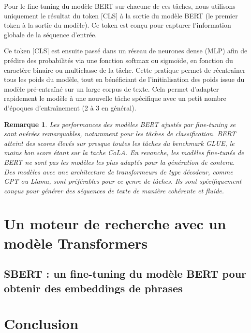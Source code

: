 \documentclass[12pt]{article}
\newtheorem{rmq}{Remarque}
\theoremstyle{definition}
\begin{document}
Pour le fine-tuning du modèle BERT sur chacune de ces tâches, nous utilisons uniquement le résultat du token [CLS] à la sortie du modèle BERT (le premier token à la sortie du modèle). Ce token est conçu pour capturer l'information globale de la séquence d'entrée.

Ce token [CLS] est ensuite passé dans un réseau de neurones dense (MLP) afin de prédire des probabilités via une fonction softmax ou sigmoïde, en fonction du caractère binaire ou multiclasse de la tâche. Cette pratique permet de réentraîner tous les poids du modèle, tout en bénéficiant de l’initialisation des poids issue du modèle pré-entraîné sur un large corpus de texte. Cela permet d'adapter rapidement le modèle à une nouvelle tâche spécifique avec un petit nombre d'époques d'entraînement (2 à 3 en général).

\begin{rmq}
	Les performances des modèles BERT ajustés par fine-tuning se sont avérées remarquables, notamment pour les tâches de classification. BERT atteint des scores élevés sur presque toutes les tâches du benchmark GLUE, le moins bon score étant sur la tache CoLA. En revanche, les modèles fine-tunés de BERT ne sont pas les modèles les plus adaptés pour la génération de contenu. Des modèles avec une architecture de transformeurs de type décodeur, comme GPT ou Llama, sont préférables pour ce genre de tâches. Ils sont spécifiquement conçus pour générer des séquences de texte de manière cohérente et fluide.
\end{rmq}

\section{Un moteur de recherche avec un modèle Transformers}

\subsection{SBERT : un fine-tuning du modèle BERT pour obtenir des embeddings de phrases}







\section{Conclusion}



	
\end{document}
